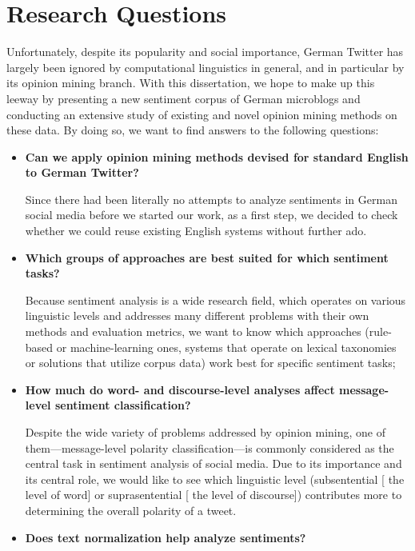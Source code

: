 \section*{Research Questions}

Unfortunately, despite its popularity and social importance, German
Twitter has largely been ignored by computational linguistics in
general, and in particular by its opinion mining branch.  With this
dissertation, we hope to make up this leeway by presenting a new
sentiment corpus of German microblogs and conducting an extensive
study of existing and novel opinion mining methods on these data.  By
doing so, we want to find answers to the following questions:

\begin{itemize}
\item\textbf{Can we apply opinion mining methods devised for
  standard English to German Twitter?}

  Since there had been literally no attempts to analyze sentiments in
  German social media before we started our work, as a first step, we
  decided to check whether we could reuse existing English systems
  without further ado.

\item\textbf{Which groups of approaches are best suited for which
  sentiment tasks?}

  Because sentiment analysis is a wide research field, which operates
  on various linguistic levels and addresses many different problems
  with their own methods and evaluation metrics, we want to know which
  approaches (rule-based or machine-learning ones, systems that
  operate on lexical taxonomies or solutions that utilize corpus data)
  work best for specific sentiment tasks;

\item\textbf{How much do word- and discourse-level analyses affect
  message-level sentiment classification?}

  Despite the wide variety of problems addressed by opinion mining,
  one of them---message-level polarity classification---is commonly
  considered as the central task in sentiment analysis of social
  media.  Due to its importance and its central role, we would like to
  see which linguistic level (subsentential [\ie{} the level of word]
  or suprasentential [\ie{} the level of discourse]) contributes more
  to determining the overall polarity of a tweet.

\item\textbf{Does text normalization help analyze sentiments?}


\end{itemize}
